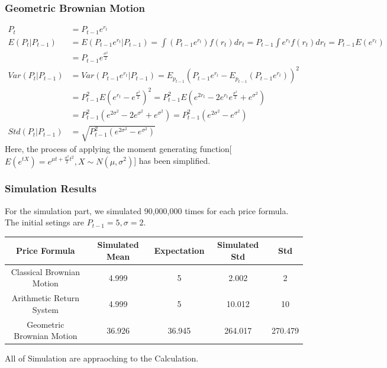 \documentclass[a4paper,12pt]{article}
\begin{document}
\subsubsection*{Geometric Brownian Motion}
\begin{displaymath}
    \begin{split}
        P_{t} &= P_{t-1}e^{r_{t}}\\
        E(P_{t}|P_{t-1}) &= E(P_{t-1}e^{r_{t}}|P_{t-1}) = \int (P_{t-1}e^{r_{t}})f(r_{t})dr_{t} = P_{t-1}\int e^{r_{t}}f(r_{t})dr_{t} = P_{t-1}E(e^{r_{t}}) \\
                        & = P_{t-1} e^{\frac{\sigma^{2}}{2}}\\
        Var(P_t|P_{t-1}) &= Var(P_{t-1}e^{r_{t}}|P_{t-1}) = E_{p_{t-1}}(P_{t-1}e^{r_{t}}-E_{p_{t-1}}(P_{t-1}e^{r_{t}}))^{2}\\
                        &= P_{t-1}^{2}E(e^{r_{t}}-e^{\frac{\sigma^{2}}{2}})^{2} = P_{t-1}^{2}E(e^{2r_t}-2e^{r_t}e^{\frac{\sigma^{2}}{2}}+e^{\sigma^{2}})\\
                        &= P_{t-1}^{2}(e^{2\sigma^{2}}-2e^{\sigma^{2}}+e^{\sigma^{2}}) = P^{2}_{t-1}(e^{2\sigma^{2}}-e^{\sigma^{2}})\\
        Std(P_t|P_{t-1}) & = \sqrt{P^{2}_{t-1}(e^{2\sigma^{2}}-e^{\sigma^{2}})}
    \end{split}
\end{displaymath}
Here, the process of applying the moment generating function[$E(e^{tX}) = e^{\mu t+\frac{\sigma^{2}}{2}t^2},X\sim N(\mu,\sigma^{2})$] has been simplified.

\subsubsection*{Simulation Results}
For the simulation part, we simulated 90,000,000 times for each price formula. The initial setings are $P_{t-1} = 5,\sigma=2$.
\begin{center}
    \begin{tabular}{ c|c|c|c|c }
     \hline
     Price Formula & Simulated Mean & Expectation & Simulated Std & Std \\ 
     \hline
     Classical Brownian Motion& 4.999&5 & 2.002 &2\\ 
     Arithmetic Return System & 4.999&5 &10.012 &10\\ 
     Geometric Brownian Motion & 36.926& 36.945 & 264.017&270.479 \\ 
     \hline
    \end{tabular}
    \end{center}
All of Simulation are appraoching to the Calculation.
\newpage
\end{document}
